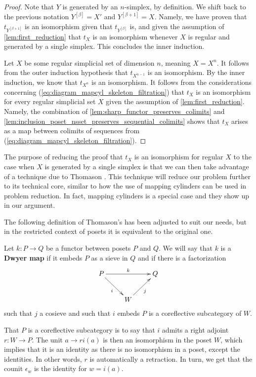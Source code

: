 \begin{proof}
Note that $Y$ is generated by an $n$-simplex, by definition. We shift back to the previous notation $Y^{[\beta ]}=X'$ and $Y^{[\beta +1]}=X$. Namely, we have proven that $t_{Y^{[\beta +1]}}$ is an isomorphism given that $t_{Y^{[\beta ]}}$ is, and given the assumption of \cref{lem:first_reduction} that $t_X$ is an isomorphism whenever $X$ is regular and generated by a single simplex. This concludes the inner induction.

Let $X$ be some regular simplicial set of dimension $n$, meaning $X=X^n$. It follows from the outer induction hypothesis that $t_{X^{n-1}}$ is an isomorphism. By the inner induction, we know that $t_{X^n}$ is an isomorphism. It follows from the considerations concerning (\ref{eq:diagram_mapcyl_skeleton_filtration}) that $t_X$ is an isomorphism for every regular simplicial set $X$ given the assumption of \cref{lem:first_reduction}. Namely, the combination of \cref{lem:sharp_functor_preserves_colimits} and \cref{lem:inclusion_poset_nsset_preserves_sequential_colimits} shows that $t_X$ arises as a map between colimits of sequences from (\ref{eq:diagram_mapcyl_skeleton_filtration}).
\end{proof}
\noindent The purpose of reducing the proof that $t_X$ is an isomorphism for regular $X$ to the case when $X$ is generated by a single simplex is that we can then take advantage of a technique due to Thomason \cite{Th80}. This technique will reduce our problem further to its technical core, similar to how the use of mapping cylinders can be used in problem reduction. In fact, mapping cylinders is a special case and they show up in our argument.

The following definition of Thomason's \cite{Th80} has been adjusted to suit our needs, but in the restricted context of posets it is equivalent to the original one.
\begin{definition}[Thomason]\label{def:dwyer_map}
Let $k:P\to Q$ be a functor between posets $P$ and $Q$. We will say that $k$ is a \textbf{Dwyer map} if it embeds $P$ as a sieve in $Q$ and if there is a factorization
\begin{equation}
\label{eq:diagram_def_dwyer_map}
\begin{gathered}
\xymatrix{
P \ar[dr]_i \ar[rr]^k && Q \\
& W \ar[ur]_j
}
\end{gathered}
\end{equation}
such that $j$ a cosieve and such that $i$ embeds $P$ is a coreflective subcategory of $W$.
\end{definition}
\noindent That $P$ is a coreflective subcategory is to say that $i$ admits a right adjoint $r:W\to P$. The unit $a\to ri(a)$ is then an isomorphism in the poset $W$, which implies that it is an identity as there is no isomorphism in a poset, except the identities. In other words, $r$ is automatically a retraction. In turn, we get that the counit $\epsilon _w$ is the identity for $w=i(a)$.

